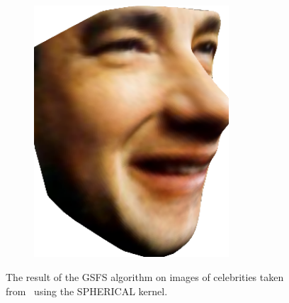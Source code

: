 \begin{figure}
\begin{subfigure}{0.32\textwidth}
\label{fig:tom-hanks-no-texture}
    \end{subfigure}
    \begin{subfigure}{0.32\textwidth}
        \centering
        \includegraphics[width=0.8\textwidth]{statistical_normals/images/gsfs_results/celebrities/tom_hanks_spherical_texture.png}
\label{fig:tom-hanks-textured}
    \end{subfigure}
    \caption{The result of the GSFS algorithm on images of celebrities taken
             from~\cite{RefWorks:226} using the SPHERICAL kernel.}
\label{fig:celebrities}
\end{figure}
